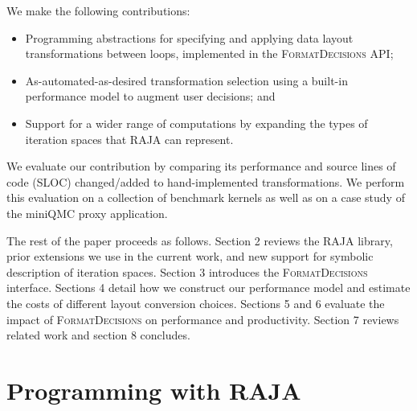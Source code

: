\documentclass[sigconf,review=true]{acmart}
\newcommand{\FormatDecisions}[0]{{\textsc{FormatDecisions}}}
\begin{document}
We make the following contributions:
\begin{itemize}
\item Programming abstractions for specifying and applying data layout transformations between loops, implemented in the \FormatDecisions{} API;
\item As-automated-as-desired transformation selection using a built-in performance model to augment user decisions; and 
\item Support for a wider range of computations by expanding the types of iteration spaces that RAJA can represent.
\end{itemize}
We evaluate our contribution by comparing its performance and source lines of code (SLOC) changed/added to hand-implemented transformations.
We perform this evaluation on a collection of benchmark kernels as well as on a case study of the miniQMC proxy application. 

The rest of the paper proceeds as follows. 
Section 2 reviews the RAJA library, prior extensions we use in the current work, and new support for symbolic description of iteration spaces.
Section 3 introduces the \FormatDecisions{} interface.
Sections 4 detail how we construct our performance model and estimate the costs of different layout conversion choices.
Sections 5 and 6 evaluate the impact of \FormatDecisions{}  on performance and productivity.
Section 7 reviews related work and section 8 concludes.



\section{Programming with RAJA}
\end{document}
